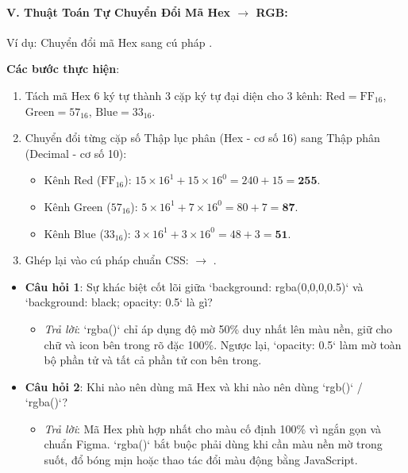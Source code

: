 \paragraph{V. Thuật Toán Tự Chuyển Đổi Mã Hex $\rightarrow$ RGB:}
\begin{conceptBox}
Ví dụ: Chuyển đổi mã Hex  sang cú pháp .

\textbf{Các bước thực hiện}:
\begin{enumerate}[leftmargin=1.5em, itemsep=2pt]
    \item Tách mã Hex 6 ký tự thành 3 cặp ký tự đại diện cho 3 kênh:
    $\text{Red} = \text{FF}_{16}$, $\text{Green} = 57_{16}$, $\text{Blue} = 33_{16}$.
    \item Chuyển đổi từng cặp số Thập lục phân (Hex - cơ số 16) sang Thập phân (Decimal - cơ số 10):
    \begin{itemize}[leftmargin=1.2em]
        \item Kênh Red ($\text{FF}_{16}$): $15 \times 16^1 + 15 \times 16^0 = 240 + 15 = \mathbf{255}$.
        \item Kênh Green ($57_{16}$): $5 \times 16^1 + 7 \times 16^0 = 80 + 7 = \mathbf{87}$.
        \item Kênh Blue ($33_{16}$): $3 \times 16^1 + 3 \times 16^0 = 48 + 3 = \mathbf{51}$.
    \end{itemize}
    \item Ghép lại vào cú pháp chuẩn CSS: $\rightarrow$ .
\end{enumerate}
\end{conceptBox}

\begin{conceptBox}
\begin{itemize}[leftmargin=1.5em, itemsep=4pt, parsep=0pt]
    \item \textbf{Câu hỏi 1}: Sự khác biệt cốt lõi giữa `background: rgba(0,0,0,0.5)` và `background: black; opacity: 0.5` là gì?
    \begin{itemize}[leftmargin=1.2em]
        \item \textit{Trả lời}: `rgba()` chỉ áp dụng độ mờ 50\% duy nhất lên màu nền, giữ cho chữ và icon bên trong rõ đặc 100\%. Ngược lại, `opacity: 0.5` làm mờ toàn bộ phần tử và tất cả phần tử con bên trong.
    \end{itemize}
    \item \textbf{Câu hỏi 2}: Khi nào nên dùng mã Hex và khi nào nên dùng `rgb()` / `rgba()`?
    \begin{itemize}[leftmargin=1.2em]
        \item \textit{Trả lời}: Mã Hex phù hợp nhất cho màu cố định 100\% vì ngắn gọn và chuẩn Figma. `rgba()` bắt buộc phải dùng khi cần màu nền mờ trong suốt, đổ bóng mịn hoặc thao tác đổi màu động bằng JavaScript.
    \end{itemize}
\end{itemize}
\end{conceptBox}


